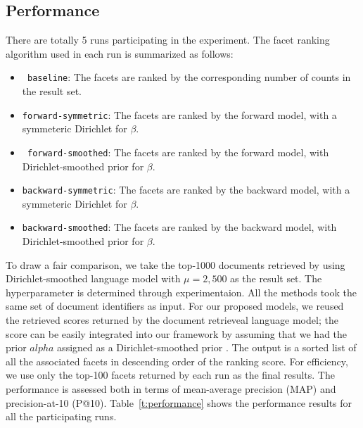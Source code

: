 \subsection{Performance}

There are totally 5 runs participating in the experiment.  The facet ranking
algorithm used in each run is summarized as follows: \begin{itemize} \item {\tt
baseline}:  The facets are ranked by the corresponding number of counts in the
result set.  \item {\tt forward-symmetric}:  The facets are ranked by the
forward model, with a symmeteric Dirichlet for $\beta$.  \item {\tt
forward-smoothed}:  The facets are ranked by the forward model, with
Dirichlet-smoothed prior for $\beta$.  \item {\tt backward-symmetric}:  The
facets are ranked by the backward model, with a symmeteric Dirichlet for
$\beta$.  \item {\tt backward-smoothed}:  The facets are ranked by the backward
model, with Dirichlet-smoothed prior for $\beta$.  \end{itemize}

To draw a fair comparison, we take the top-1000 documents retrieved by using
Dirichlet-smoothed language model with $\mu = 2,500$ as the result set.  The
hyperparameter is determined through experimentaion.  All the methods took the
same set of document identifiers as input.  For our proposed models, we reused
the retrieved scores returned by the document retrieveal language model; the
score can be easily integrated into our framework by assuming that we had the
prior $alpha$ assigned as a Dirichlet-smoothed prior .  The output is a sorted list of all the associated
facets in descending order of the ranking score.  For efficiency, we use only
the top-100 facets returned by each run as the final results.  The performance
is assessed both in terms of mean-average precision (MAP) and precision-at-10
(P@10).  Table~\ref{t:performance} shows the performance results for all the
participating runs.

